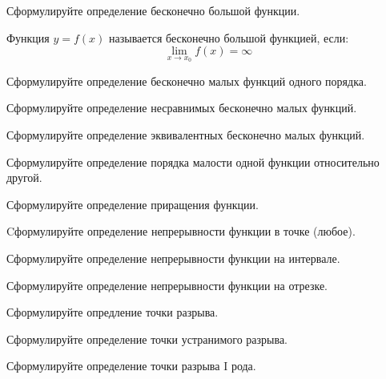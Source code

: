 \begin{question}
  Сформулируйте определение бесконечно большой функции.
\end{question}
\begin{answer}
  Функция $y=f(x)$ называется бесконечно большой функцией, если: \[
  \lim_{x \to x_0} f(x) = \infty
  \] 
\end{answer}

\begin{question}
  Сформулируйте определение бесконечно малых функций одного порядка.
\end{question}

\begin{question}
  Сформулируйте определение несравнимых бесконечно малых функций. 
\end{question}

\begin{question}
  Сформулируйте определение эквивалентных бесконечно малых функций. 
\end{question}

\begin{question}
  Сформулируйте определение порядка малости одной функции относительно
другой.
\end{question}

\begin{question}
  Сформулируйте определение приращения функции. 
\end{question}

\begin{question}
  Cформулируйте определение непрерывности функции в точке (любое). 
\end{question}

\begin{question}
  Сформулируйте определение непрерывности функции на интервале.
\end{question}

\begin{question}
  Сформулируйте определение непрерывности функции на отрезке.
\end{question}

\begin{question}
  Сформулируйте опредление точки разрыва.
\end{question}

\begin{question}
  Сформулируйте определение точки устранимого разрыва.
\end{question}

\begin{question}
  Сформулируйте определение точки разрыва I рода.
\end{question}

